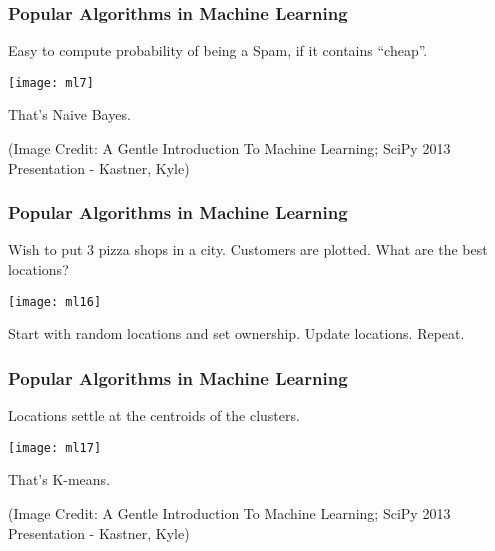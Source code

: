 \begin{frame}[fragile]\frametitle{Popular Algorithms in Machine Learning}
Easy to compute probability of being a Spam, if it contains ``cheap''.
\begin{center}
\texttt{[image: ml7]}
\end{center}
That's Naive Bayes.

\tiny{(Image Credit: A Gentle Introduction To Machine Learning; SciPy 2013 Presentation - Kastner, Kyle)}
\end{frame}

\begin{frame}[fragile]\frametitle{Popular Algorithms in Machine Learning}
Wish to put 3 pizza shops in a city. Customers are plotted. What are the best locations?
\begin{center}
\texttt{[image: ml16]}
\end{center}
Start with random locations and set ownership. Update locations. Repeat.
\end{frame}

\begin{frame}[fragile]\frametitle{Popular Algorithms in Machine Learning}
Locations settle at the centroids of the clusters.
\begin{center}
\texttt{[image: ml17]}
\end{center}
That's K-means.

\tiny{(Image Credit: A Gentle Introduction To Machine Learning; SciPy 2013 Presentation - Kastner, Kyle)}
\end{frame}



